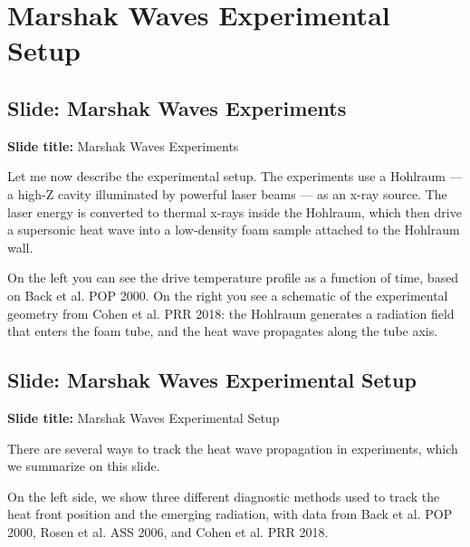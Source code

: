 \documentclass[12pt, a4paper]{article}
\begin{document}
\section{Marshak Waves Experimental Setup}

\subsection{Slide: Marshak Waves Experiments}

\begin{slidebox}
\textbf{Slide title:} Marshak Waves Experiments
\end{slidebox}

Let me now describe the experimental setup. The experiments use a Hohlraum --- a high-Z cavity illuminated by powerful laser beams --- as an x-ray source. The laser energy is converted to thermal x-rays inside the Hohlraum, which then drive a supersonic heat wave into a low-density foam sample attached to the Hohlraum wall.

On the left you can see the drive temperature profile as a function of time, based on Back et al. POP 2000. On the right you see a schematic of the experimental geometry from Cohen et al. PRR 2018: the Hohlraum generates a radiation field that enters the foam tube, and the heat wave propagates along the tube axis.

\subsection{Slide: Marshak Waves Experimental Setup}

\begin{slidebox}
\textbf{Slide title:} Marshak Waves Experimental Setup
\end{slidebox}

There are several ways to track the heat wave propagation in experiments, which we summarize on this slide.

On the left side, we show three different diagnostic methods used to track the heat front position and the emerging radiation, with data from Back et al. POP 2000, Rosen et al. ASS 2006, and Cohen et al. PRR 2018.
\end{document}
